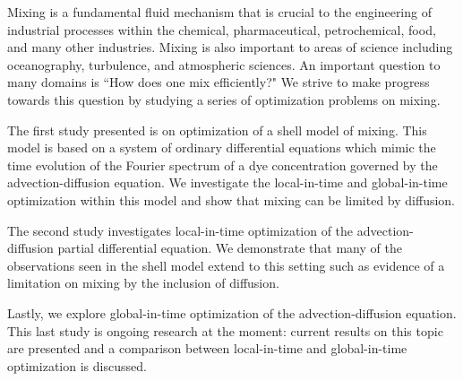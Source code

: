 Mixing is a fundamental fluid mechanism that is crucial to the engineering of industrial processes within the chemical, pharmaceutical, petrochemical, food, and many other industries. Mixing is also important to areas of science including oceanography, turbulence, and atmospheric sciences. An important question to many domains is ``How does one mix efficiently?" We strive to make progress towards this question by studying a series of optimization problems on mixing. 

The first study presented is on optimization of a shell model of mixing. This model is based on a system of ordinary differential equations which mimic the time evolution of the Fourier spectrum of a dye concentration governed by the advection-diffusion equation. We investigate the local-in-time and global-in-time optimization within this model and show that mixing can be limited by diffusion. 

The second study investigates local-in-time optimization of the advection-diffusion partial differential equation. We demonstrate that many of the observations seen in the shell model extend to this setting such as evidence of a limitation on mixing by the inclusion of diffusion.

Lastly, we explore global-in-time optimization of the advection-diffusion equation. This last study is ongoing research at the moment: current results on this topic are presented and a comparison between local-in-time and global-in-time optimization is discussed. 